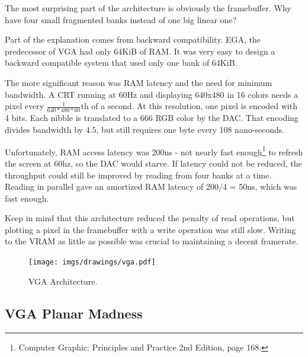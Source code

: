 \documentclass[book.tex]{subfiles}
\begin{document}
The most surprising part of the architecture is obviously the framebuffer. Why have four small fragmented banks instead of one big linear one?\\
\par
Part of the explanation comes from backward compatibility. EGA, the predecessor of VGA had only 64KiB of RAM. It was very easy to design a backward compatible system that used only one bank of 64KiB.\\
\par
The more significant reason was RAM latency and the need for minimum bandwidth. A CRT running at 60Hz and displaying 640x480 in 16 colors needs a pixel every $\frac{1}{640*480*60}$th of a second. At this resolution, one pixel is encoded with 4 bits. Each nibble is translated to a 666 RGB color by the DAC. That encoding divides bandwidth by $4.5$, but still requires one byte every 108 nano-seconds.\\
\par
 Unfortunately, RAM access latency was 200ns - not nearly fast enough\footnote{Computer Graphic: Principles and Practice 2nd Edition, page 168.} to refresh the screen at 60hz, so the DAC would starve. If latency could not be reduced, the throughput could still be improved by reading from four banks at a time. Reading in parallel gave an amortized RAM latency of 200/4 = 50ns, which was fast enough.\\
\par
Keep in mind that this architecture reduced the penalty of read operations, but plotting a pixel in the framebuffer with a write operation was still slow. Writing to the VRAM as little as possible was crucial to maintaining a decent framerate. 


\begin{figure}[H]
\centering
\texttt{[image: imgs/drawings/vga.pdf]}
\caption{VGA Architecture.}
\label{fig:vga_arch}
\end{figure}




\subsection{VGA Planar Madness}
\end{document}
